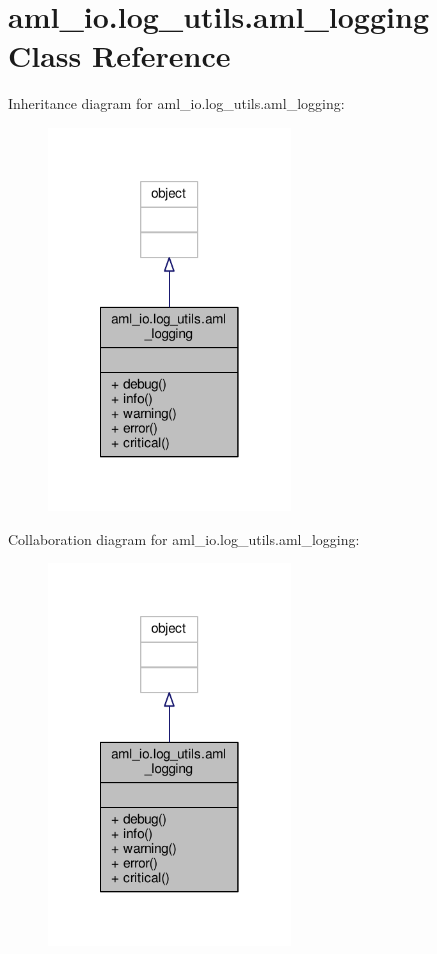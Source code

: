 \hypertarget{classaml__io_1_1log__utils_1_1aml__logging}{\section{aml\-\_\-io.\-log\-\_\-utils.\-aml\-\_\-logging Class Reference}
\label{classaml__io_1_1log__utils_1_1aml__logging}
}


Inheritance diagram for aml\-\_\-io.\-log\-\_\-utils.\-aml\-\_\-logging\-:\nopagebreak
\begin{figure}[H]
\begin{center}
\leavevmode
\includegraphics[width=182pt]{classaml__io_1_1log__utils_1_1aml__logging__inherit__graph}
\end{center}
\end{figure}


Collaboration diagram for aml\-\_\-io.\-log\-\_\-utils.\-aml\-\_\-logging\-:\nopagebreak
\begin{figure}[H]
\begin{center}
\leavevmode
\includegraphics[width=182pt]{classaml__io_1_1log__utils_1_1aml__logging__coll__graph}
\end{center}
\end{figure}
